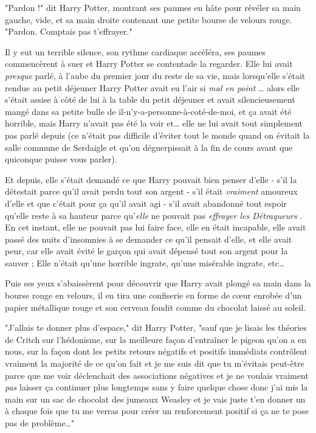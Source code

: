 "Pardon !" dit Harry Potter, montrant ses paumes en hâte pour révéler sa main gauche, vide, et sa main droite contenant une petite bourse de velours rouge. "Pardon. Comptais pas t'effrayer."

Il y eut un terrible silence, son rythme cardiaque accéléra, ses paumes commencèrent à suer et Harry Potter se contentade la regarder. Elle lui avait \emph{presque}  parlé, à l'aube du premier jour du reste de sa vie, mais lorsqu'elle s'était rendue au petit déjeuner Harry Potter avait eu l'air si \emph{mal en point} … alors elle s'était assise à côté de lui à la table du petit déjeuner et avait silencieusement mangé dans sa petite bulle de il-n'y-a-personne-à-coté-de-moi, et ça avait été horrible, mais Harry n'avait pas été la voir et… elle ne lui avait tout simplement pas parlé depuis (ce n'était pas difficile d'éviter tout le monde quand on évitait la salle commune de Serdaigle et qu'on déguerpissait à la fin de cours avant que quiconque puisse vous parler).

Et depuis, elle s'était demandé ce que Harry pouvait bien penser d'elle - s'il la détestait parce qu'il avait perdu tout son argent - s'il était \emph{vraiment}  amoureux d'elle et que c'était pour ça qu'il avait agi - s'il avait abandonné tout espoir qu'elle reste à sa hauteur parce qu'\emph{elle}  ne pouvait pas \emph{effrayer les Détraqueurs} . En cet instant, elle ne pouvait pas lui faire face, elle en était incapable, elle avait passé des nuits d'insomnies à se demander ce qu'il pensait d'elle, et elle avait peur, car elle avait évité le garçon qui avait dépensé tout son argent pour la sauver ; Elle n'était qu'une horrible ingrate, qu'une misérable ingrate, etc…

Puis ses yeux s'abaissèrent pour découvrir que Harry avait plongé sa main dans la bourse rouge en velours, il en tira une confiserie en forme de cœur enrobée d'un papier métallique rouge et son cerveau fondit comme du chocolat laissé au soleil.

"J'allais te donner plus d'espace," dit Harry Potter, "sauf que je lisais les théories de Critch sur l'hédonisme, sur la meilleure façon d'entraîner le pigeon qu'on a en nous, sur la façon dont les petits retours négatifs et positifs immédiats contrôlent vraiment la majorité de ce qu'on fait et je me suis dit que tu m'évitais peut-être parce que me voir déclenchait des associations négatives et je ne voulais vraiment \emph{pas}  laisser ça continuer plus longtemps sans y faire quelque chose donc j'ai mis la main sur un sac de chocolat des jumeaux Weasley et je vais juste t'en donner un à chaque fois que tu me verras pour créer un renforcement positif si ça ne te pose pas de problème…"

